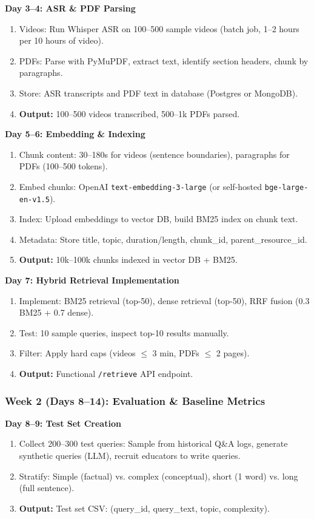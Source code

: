 \documentclass[11pt,letterpaper]{article}
\begin{document}
\textbf{Day 3--4: ASR \& PDF Parsing}
\begin{enumerate}
\item Videos: Run Whisper ASR on 100--500 sample videos (batch job, 1--2 hours per 10 hours of video).
\item PDFs: Parse with PyMuPDF, extract text, identify section headers, chunk by paragraphs.
\item Store: ASR transcripts and PDF text in database (Postgres or MongoDB).
\item \textbf{Output:} 100--500 videos transcribed, 500--1k PDFs parsed.
\end{enumerate}

\textbf{Day 5--6: Embedding \& Indexing}
\begin{enumerate}
\item Chunk content: 30--180s for videos (sentence boundaries), paragraphs for PDFs (100--500 tokens).
\item Embed chunks: OpenAI \texttt{text-embedding-3-large} (or self-hosted \texttt{bge-large-en-v1.5}).
\item Index: Upload embeddings to vector DB, build BM25 index on chunk text.
\item Metadata: Store title, topic, duration/length, chunk\_id, parent\_resource\_id.
\item \textbf{Output:} 10k--100k chunks indexed in vector DB + BM25.
\end{enumerate}

\textbf{Day 7: Hybrid Retrieval Implementation}
\begin{enumerate}
\item Implement: BM25 retrieval (top-50), dense retrieval (top-50), RRF fusion (0.3 BM25 + 0.7 dense).
\item Test: 10 sample queries, inspect top-10 results manually.
\item Filter: Apply hard caps (videos $\leq$ 3 min, PDFs $\leq$ 2 pages).
\item \textbf{Output:} Functional \texttt{/retrieve} API endpoint.
\end{enumerate}

\subsubsection{Week 2 (Days 8--14): Evaluation \& Baseline Metrics}

\textbf{Day 8--9: Test Set Creation}
\begin{enumerate}
\item Collect 200--300 test queries: Sample from historical Q\&A logs, generate synthetic queries (LLM), recruit educators to write queries.
\item Stratify: Simple (factual) vs. complex (conceptual), short (1 word) vs. long (full sentence).
\item \textbf{Output:} Test set CSV: (query\_id, query\_text, topic, complexity).
\end{enumerate}
\end{document}
